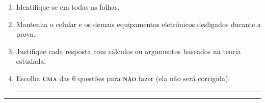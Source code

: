\documentclass[12pt,a4paper]{article}
\begin{document}
{\footnotesize
\begin{enumerate}
\renewcommand{\theenumi}{\Roman{enumi}}
\item Identifique-se em todas as folhas.
\item Mantenha o celular e os demais equipamentos eletrônicos desligados durante a prova.
\item Justifique cada resposta com cálculos ou argumentos baseados na teoria estudada.
\item Escolha \textsc{\textbf{uma}} das 6 questões para \textsc{\textbf{não}} fazer (ela não será corrigida): \rule{3cm}{0.01cm}
\end{enumerate}
}
\noindent\rule{17cm}{0.01cm}
\end{document}
